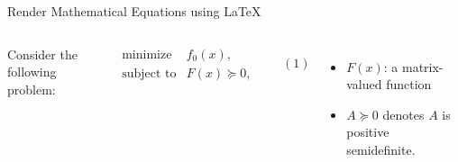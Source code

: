 \documentclass[10pt,ignorenonframetext,serif,onlymath]{beamer}
\newenvironment{Shaded}{}{}
\newcommand{\NormalTok}[1]{#1}
\newcommand{\SpecialCharTok}[1]{\textcolor[rgb]{0.25,0.44,0.63}{#1}}
\newcommand{\SpecialStringTok}[1]{\textcolor[rgb]{0.73,0.40,0.53}{#1}}
\providecommand{\tightlist}{%
  \setlength{\itemsep}{0pt}\setlength{\parskip}{0pt}}
\begin{document}
\begin{frame}[fragile]{Render Mathematical Equations using LaTeX}
\protect\hypertarget{sec:render-mathematical-equations-using-latex}{}

\begin{columns}


\scriptsize

\begin{Shaded}
\end{Shaded}


Consider the following problem:

\protect\hypertarget{eq:semidef}{}{\[\begin{array}{ll}
  \text{minimize}    & f_0(x), \\
  \text{subject to}  & F(x) \succeq 0,
\end{array}\qquad(1)\]}

\begin{itemize}
\tightlist
\item
  \(F(x)\): a matrix-valued function
\item
  \(A \succeq 0\) denotes \(A\) is positive semidefinite.
\end{itemize}

\end{columns}

\end{frame}
\end{document}
